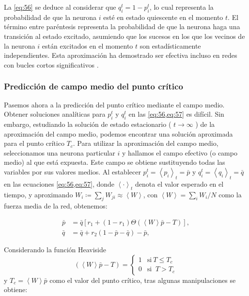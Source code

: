 La \cref{eq:56} se deduce al considerar que  $q_i^t=1-p_i^t$, lo cual representa la probabilidad de que la neurona $i$ esté en estado quiescente en el momento $t$. El término entre paréntesis representa la probabilidad de que la neurona haga una transición al estado excitado, asumiendo que los sucesos en los que los vecinos de la neurona $i$ están excitados en el momento  $t$ son estadísticamente independientes.  Esta aproximación ha demostrado ser efectiva incluso en redes con bucles cortos significativos \cite{rocha_homeostatic_2018,larremore_predicting_2011}.


\subsubsection{Predicción de campo medio del punto crítico}\label{sec:campomedio}

Pasemos ahora a la predicción del punto crítico mediante el campo medio. Obtener soluciones analíticas para  $p_i^t$ y $q_i^t$ en  las \cref{eq:56,eq:57} es difícil. Sin embargo, estudiando la solución de estado estacionario  ( $t \to\infty$ ) de la aproximación del campo medio, podemos encontrar una solución aproximada para el punto crítico $T_c$.  Para utilizar la aproximación del campo medio, seleccionamos una neurona particular $i$  y hallamos el campo efectivo (o campo medio) al que está expuesta.  Este campo se obtiene sustituyendo todas las variables por sus valores medios. Al establecer  $p_i^t = \left\langle p_i \right\rangle_t   = \bar{p}$ y $q_i^t =\left\langle q_i\right\rangle_t = \bar{q}$ en las ecuaciones \cref{eq:56,eq:57}, donde $\left\langle \cdot \right\rangle_t$ denota el valor esperado en el tiempo, y aproximando $W_i \coloneqq \sum_j W_{ji} \approx \left\langle W \right\rangle$,  con $\left\langle W \right\rangle = \sum_i W_i/N$ como la fuerza media de la red, obtenemos:
 

\begin{align}
	\bar{p}&=\bar{q}\left[r_1+\left(1-r_1\right)\Theta\left(\left< W\right>\bar{p}-T\right)\right], \label{eq:76}\\
	\bar{q}&=\bar{q}+r_2\left(1-\bar{p}-\bar{q}\right)-\bar{p} \label{eq:77},
\end{align}

Considerando la función Heaviside \[\left(\left< W\right>\bar{p}-T\right) = \begin{cases}
	1 & \text{si} \ T\leq T_c\\
	0 &  \text{si } \ T>T_c
\end{cases}\] y $T_c=\left< W\right>\bar{p}$ como el valor del punto crítico, tras algunas manipulaciones se obtiene:

